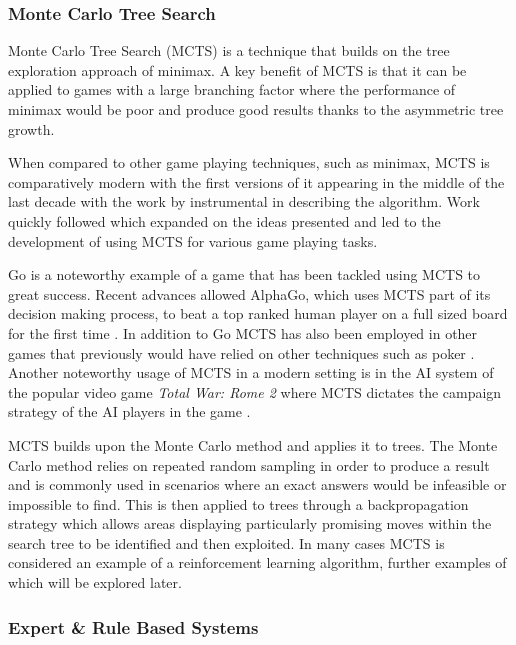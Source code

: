 \documentclass[]{article}
\begin{document}
\subsubsection{Monte Carlo Tree Search}
Monte Carlo Tree Search (MCTS) is a technique that builds on the tree exploration approach of minimax. A key benefit of MCTS is that it can be applied to games with a large branching factor where the performance of minimax would be poor and produce good results thanks to the asymmetric tree growth. 

\par When compared to other game playing techniques, such as minimax, MCTS is comparatively modern with the first versions of it appearing in the middle of the last decade with the work by \textcite{kocsis2006bandit} instrumental in describing the algorithm. Work quickly followed which expanded on the ideas presented and led to the development of using MCTS for various game playing tasks. 

\par Go is a noteworthy example of a game that has been tackled using MCTS to great success. Recent advances allowed AlphaGo, which uses MCTS part of its decision making process, to beat a top ranked human player on a full sized board for the first time \autocite{churchland2016computational, chang2016google}. In addition to Go MCTS has also been employed in other games that previously would have relied on other techniques such as poker \autocite{van2009monte}. Another noteworthy usage of MCTS in a modern setting is in the AI system of the popular video game \textit{Total War: Rome 2} where MCTS dictates the campaign strategy of the AI players in the game \autocite{champandard2014monte}. 

\par MCTS builds upon the Monte Carlo method and applies it to trees. The Monte Carlo method relies on repeated random sampling in order to produce a result and is commonly used in scenarios where an exact answers would be infeasible or impossible to find. This is then applied to trees through a backpropagation strategy which allows areas displaying particularly promising moves within the search tree to be identified and then exploited. In many cases MCTS is considered an example of a reinforcement learning algorithm, further examples of which will be explored later.

\subsubsection{Expert \& Rule Based Systems}
\end{document}
